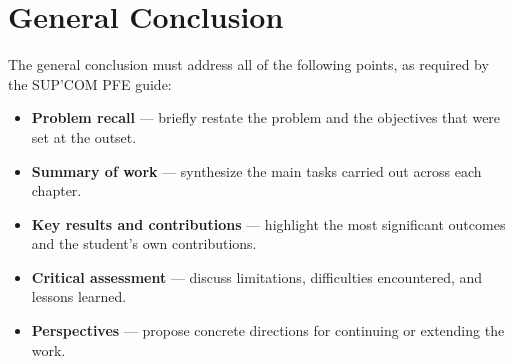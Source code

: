 \chapter*{General Conclusion}

The general conclusion must address all of the following points, as required by the SUP'COM PFE guide:
\begin{itemize}
    \item \textbf{Problem recall} --- briefly restate the problem and the objectives that were set at the outset.
    \item \textbf{Summary of work} --- synthesize the main tasks carried out across each chapter.
    \item \textbf{Key results and contributions} --- highlight the most significant outcomes and the student's own contributions.
    \item \textbf{Critical assessment} --- discuss limitations, difficulties encountered, and lessons learned.
    \item \textbf{Perspectives} --- propose concrete directions for continuing or extending the work.
\end{itemize}
